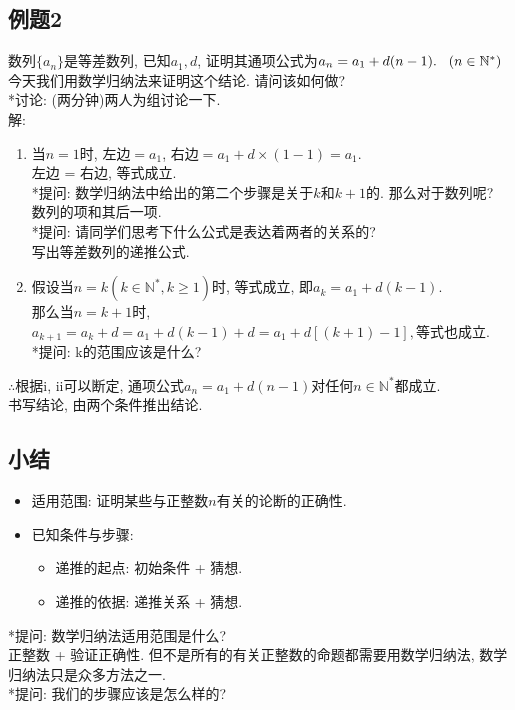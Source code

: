 \documentclass{article}
\begin{document}
\begin{CJK}{UTF8}{gkai}
\subsection{例题2}
数列$\{a_n\}$是等差数列, 已知$a_1, d$, 证明其通项公式为$a_n = a_1 + d(n-1).\hspace{3mm}(n \in \mathbb{N}^*)$ \\
今天我们用数学归纳法来证明这个结论. 请问该如何做? \\
*讨论: (两分钟)两人为组讨论一下.\\
解: \\
\begin{enumerate}[i]
\item 当$n = 1$时, 左边$= a_1$, 右边$= a_1 + d \times (1-1) = a_1$.\\左边 = 右边, 等式成立.\\
*提问: 数学归纳法中给出的第二个步骤是关于$k$和$k + 1$的. 那么对于数列呢?\\
数列的项和其后一项.\\
*提问: 请同学们思考下什么公式是表达着两者的关系的?  \\
写出等差数列的递推公式.\\

\item 假设当$n = k (k \in \mathbb{N}^*, k \ge 1)$时, 等式成立, 即$a_k = a_1 + d(k-1).$\\那么当$n = k + 1$时, $a_{k+1} = a_k + d = a_1 + d(k-1) + d = a_1 +d[(k + 1) - 1], $等式也成立.\\
*提问: k的范围应该是什么?\\
\end{enumerate}
$\therefore$根据i, ii可以断定, 通项公式$a_n = a_1 + d(n-1)$对任何$n \in \mathbb{N}^*$都成立.\\
书写结论, 由两个条件推出结论.\\

\subsection{小结}
\begin{itemize}
\item 适用范围: 证明某些与正整数$n$有关的论断的正确性.
\item 已知条件与步骤:
\begin{itemize}
\item 递推的起点: 初始条件 + 猜想.
\item 递推的依据: 递推关系 + 猜想.
\end{itemize}
\end{itemize}
*提问: 数学归纳法适用范围是什么?\\
正整数 + 验证正确性. 但不是所有的有关正整数的命题都需要用数学归纳法, 数学归纳法只是众多方法之一.\\
*提问: 我们的步骤应该是怎么样的?\\


\end{CJK}
\end{document}
